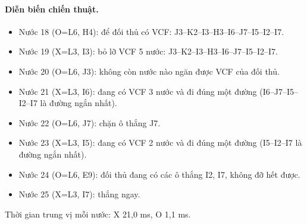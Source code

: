 \paragraph{Diễn biến chiến thuật.}
\begin{itemize}\footnotesize\linespread{1.1}\selectfont
\setlength{\itemsep}{0pt}
  \item Nước 18 (O=L6, H4): để đối thủ có VCF: J3--K2--I3--H3--I6--J7--I5--I2--I7.
  \item Nước 19 (X=L3, I3): bỏ lỡ VCF 5 nước: J3--K2--I3--H3--I6--J7--I5--I2--I7.
  \item Nước 20 (O=L6, J3): không còn nước nào ngăn được VCF của đối thủ.
  \item Nước 21 (X=L3, I6): đang có VCF 3 nước và đi đúng một đường (I6--J7--I5--I2--I7 là đường ngắn nhất).
  \item Nước 22 (O=L6, J7): chặn ô thắng J7.
  \item Nước 23 (X=L3, I5): đang có VCF 2 nước và đi đúng một đường (I5--I2--I7 là đường ngắn nhất).
  \item Nước 24 (O=L6, E9): đối thủ đang có các ô thắng I2, I7, không đỡ hết được.
  \item Nước 25 (X=L3, I7): thắng ngay.
\end{itemize}
Thời gian trung vị mỗi nước: X 21,0 ms, O 1,1 ms.
\clearpage

